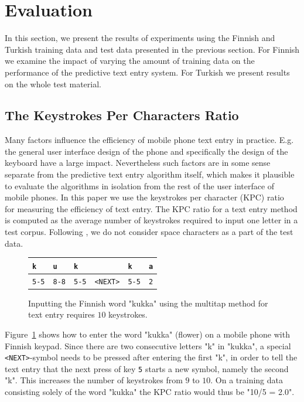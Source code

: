 \documentclass{llncs}
\begin{document}
\section{Evaluation}\label{evaluation}

In this section, we present the results of experiments using the
Finnish and Turkish training data and test data presented in the
previous section. For Finnish we examine the impact of varying the
amount of training data on the performance of the predictive text
entry system. For Turkish we present results on the whole test
material.

\subsection{The Keystrokes Per Characters Ratio}

Many factors influence the efficiency of mobile phone text entry in
practice. E.g. the general user interface design of the phone and
specifically the design of the keyboard have a large
impact. Nevertheless such factors are in some sense separate from the
predictive text entry algorithm itself, which makes it plausible to
evaluate the algorithms in isolation from the rest of the user
interface of mobile phones. In this paper we use the keystrokes per
character (KPC) ratio~\cite{MacKenzie02kspc} for measuring the
efficiency of text entry. The KPC ratio for a text entry method is
computed as the average number of keystrokes required to input one
letter in a test corpus. Following \cite{Tantug:2010}, we do not
consider space characters as a part of the test data.

\begin{figure}[htb!]
\begin{center}
\begin{tabular}{llllll}
\texttt{k} & \texttt{u} & \texttt{k} & & \texttt{k} & \texttt{a} \\ 
\hline
\texttt{5-5} & \texttt{8-8} & \texttt{5-5} & \texttt{<NEXT>} &
\texttt{5-5} & \texttt{2}
\end{tabular}
\caption{Inputting the Finnish word "kukka" using the multitap method
  for text entry requires $10$ keystrokes.}\label{kukka-kpc}
\end{center}
\end{figure}

Figure~\ref{kukka-kpc} shows how to enter the word "kukka" (flower) on
a mobile phone with Finnish keypad. Since there are two consecutive
letters "k" in "kukka", a special {\tt <NEXT>}-symbol needs to be
pressed after entering the first "k", in order to tell the text entry
that the next press of key {\tt 5} starts a new symbol, namely the
second "k". This increases the number of keystrokes from $9$ to
$10$. On a training data consisting solely of the word "kukka" the KPC
ratio would thus be "10/5 = 2.0".
\end{document}
